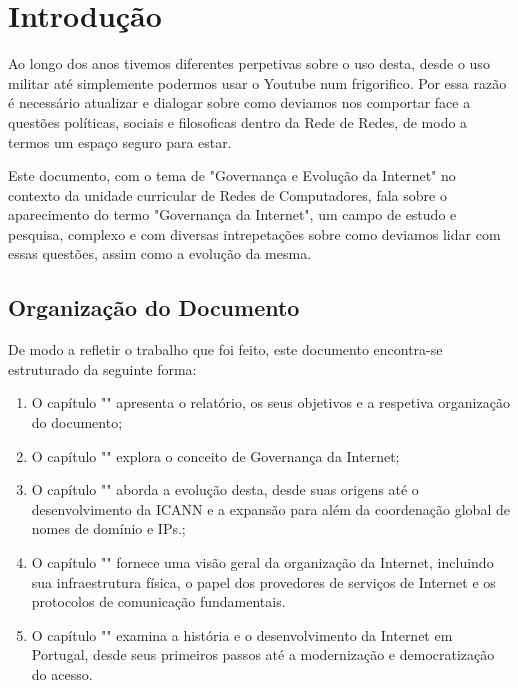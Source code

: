 \section{Introdução}
\label{sec:intro}
Ao longo dos anos tivemos diferentes perpetivas sobre o uso desta,
desde o uso militar até simplemente podermos usar o Youtube num frigorifico. Por essa razão
é necessário atualizar e dialogar sobre como deviamos nos comportar face a questões políticas, sociais e filosoficas 
dentro da Rede de Redes, de modo a termos um espaço seguro para estar.

Este documento, com o tema de "Governança e Evolução da Internet" no contexto da unidade 
curricular de Redes de Computadores, fala sobre o aparecimento do termo 
"Governança da Internet", um campo de estudo e pesquisa, complexo e com diversas 
intrepetações sobre como deviamos lidar com essas questões, assim como a evolução da mesma.

\subsection{Organização do Documento}

De modo a refletir o trabalho que foi feito, este documento encontra-se estruturado da seguinte forma:
\begin{enumerate}
  \item O capítulo "" apresenta o relatório, os seus objetivos e a respetiva organização do documento;
  
  \item O capítulo "" explora o conceito de Governança da Internet; 
  
\item O capítulo "" aborda a evolução desta, desde suas origens até o desenvolvimento da ICANN e a expansão para além da 
coordenação global de nomes de domínio e IPs.;
  
\item O capítulo "" fornece uma visão geral da organização da 
Internet, incluindo sua infraestrutura física, o papel dos provedores de serviços de Internet 
e os protocolos de comunicação fundamentais. 
  
\item O capítulo "" examina a história e o 
desenvolvimento da Internet em Portugal, desde seus primeiros passos até a 
modernização e democratização do acesso. 
\end{enumerate}
